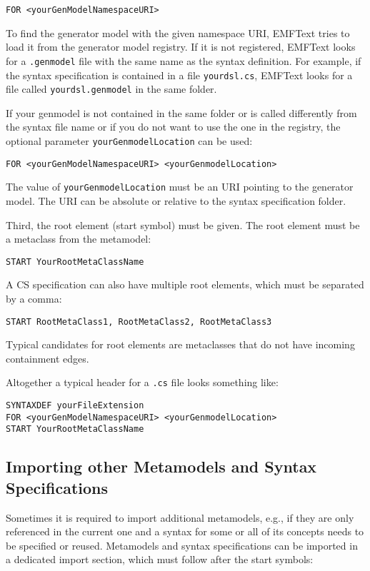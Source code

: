 \begin{lstlisting}
FOR <yourGenModelNamespaceURI>
\end{lstlisting}

To find the generator model with the given namespace URI, EMFText tries to 
load it from the generator model registry. If it is not registered, EMFText 
looks for a \texttt{.genmodel} file with the same name as the syntax 
definition. For example, if the syntax 
specification is contained in a file \texttt{yourdsl.cs}, EMFText looks for a
file called \texttt{yourdsl.genmodel} in the same folder.

If your genmodel is not contained in the same folder or is called differently
from the syntax file name or if you do not want to use the one in the registry, 
the optional parameter \texttt{yourGenmodelLocation} can be used: 

\begin{lstlisting}
FOR <yourGenModelNamespaceURI> <yourGenmodelLocation>
\end{lstlisting}

The value of \texttt{yourGenmodelLocation} must be an URI pointing to the 
generator model. The URI can be absolute or relative to the syntax 
specification folder.
 
Third, the root element (start symbol) must be given. The root element must be
a metaclass from the metamodel:

\begin{lstlisting}
START YourRootMetaClassName
\end{lstlisting}

A CS specification can also have multiple root elements, which must be separated
by a comma:

\begin{lstlisting}
START RootMetaClass1, RootMetaClass2, RootMetaClass3
\end{lstlisting}

Typical candidates for root elements are metaclasses that do not have incoming 
containment edges. 

Altogether a typical header for a \texttt{.cs} file looks something like:

\begin{lstlisting}
SYNTAXDEF yourFileExtension
FOR <yourGenModelNamespaceURI> <yourGenmodelLocation>
START YourRootMetaClassName
\end{lstlisting} 

\subsection{Importing other Metamodels and Syntax Specifications}
\label{sec:cs_import}
Sometimes it is required to import additional metamodels, e.g., if they are only
referenced in the current one and a syntax for some or all of its concepts
needs to be specified or reused. 
Metamodels and syntax specifications can be 
imported in a dedicated import section, which must follow after the start symbols:

